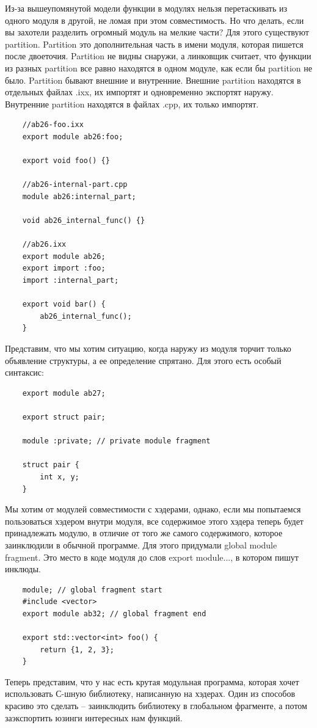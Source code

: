 \documentclass[12pt, a4paper]{article}
\begin{document}
\par Из-за вышеупомянутой модели функции в модулях нельзя перетаскивать из одного модуля в другой, не ломая при этом совместимость. Но что делать, если вы захотели разделить огромный модуль на мелкие части? Для этого существуют partition. Partition это дополнительная часть в имени модуля, которая пишется после двоеточия. Partition не видны снаружи, а линковщик считает, что функции из разных partition все равно находятся в одном модуле, как если бы partition не было. Partition бывают внешние и внутренние. Внешние partition находятся в отдельных файлах .ixx, их импортят и одновременно экспортят наружу. Внутренние partition находятся в файлах .cpp, их только импортят.
\begin{verbatim}
	//ab26-foo.ixx
	export module ab26:foo;
	
	export void foo() {}
	
	//ab26-internal-part.cpp
	module ab26:internal_part;
	
	void ab26_internal_func() {}
	
	//ab26.ixx
	export module ab26;
	export import :foo;
	import :internal_part;
	
	export void bar() {
		ab26_internal_func();
	}
\end{verbatim}
Представим, что мы хотим ситуацию, когда наружу из модуля торчит только объявление структуры, а ее определение спрятано. Для этого есть особый синтаксис:
\begin{verbatim}
	export module ab27;
	
	export struct pair;
	
	module :private; // private module fragment
	
	struct pair {
		int x, y;
	}
\end{verbatim}
Мы хотим от модулей совместимости с хэдерами, однако, если мы попытаемся пользоваться хэдером внутри модуля, все содержимое этого хэдера теперь будет принадлежать модулю, в отличие от того же самого содержимого, которое заинклюдили в обычной программе. Для этого придумали global module fragment. Это место в коде модуля до слов export module..., в котором пишут инклюды.
\begin{verbatim}
	module; // global fragment start
	#include <vector>
	export module ab32; // global fragment end
	
	export std::vector<int> foo() {
		return {1, 2, 3};
	}
\end{verbatim}
Теперь представим, что у нас есть крутая модульная программа, которая хочет использовать С-шную библиотеку, написанную на хэдерах. Один из способов красиво это сделать -- заинклюдить библиотеку в глобальном фрагменте, а потом заэкспортить юзинги интересных нам функций.
\end{document}
